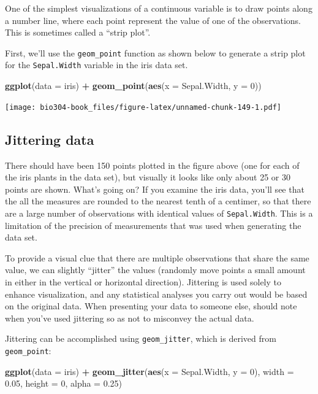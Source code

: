 \documentclass[]{book}
\newenvironment{Shaded}{\begin{snugshade}}{\end{snugshade}}
\newcommand{\DataTypeTok}[1]{\textcolor[rgb]{0.13,0.29,0.53}{#1}}
\newcommand{\DecValTok}[1]{\textcolor[rgb]{0.00,0.00,0.81}{#1}}
\newcommand{\FloatTok}[1]{\textcolor[rgb]{0.00,0.00,0.81}{#1}}
\newcommand{\KeywordTok}[1]{\textcolor[rgb]{0.13,0.29,0.53}{\textbf{#1}}}
\newcommand{\NormalTok}[1]{#1}
\newcommand{\OperatorTok}[1]{\textcolor[rgb]{0.81,0.36,0.00}{\textbf{#1}}}
\newcommand{\StringTok}[1]{\textcolor[rgb]{0.31,0.60,0.02}{#1}}
\theoremstyle{definition}
\theoremstyle{definition}
\theoremstyle{definition}
\theoremstyle{remark}
\begin{document}
One of the simplest visualizations of a continuous variable is to draw
points along a number line, where each point represent the value of one
of the observations. This is sometimes called a ``strip plot''.

First, we'll use the \texttt{geom\_point} function as shown below to
generate a strip plot for the \texttt{Sepal.Width} variable in the iris
data set.

\begin{Shaded}
\begin{Highlighting}[]
\KeywordTok{ggplot}\NormalTok{(}\DataTypeTok{data =}\NormalTok{ iris) }\OperatorTok{+}\StringTok{ }
\StringTok{  }\KeywordTok{geom_point}\NormalTok{(}\KeywordTok{aes}\NormalTok{(}\DataTypeTok{x =}\NormalTok{ Sepal.Width, }\DataTypeTok{y =} \DecValTok{0}\NormalTok{))}
\end{Highlighting}
\end{Shaded}

\texttt{[image: bio304-book\_files/figure-latex/unnamed-chunk-149-1.pdf]}

\hypertarget{jittering-data}{%
\subsection{Jittering data}\label{jittering-data}}

There should have been 150 points plotted in the figure above (one for
each of the iris plants in the data set), but visually it looks like
only about 25 or 30 points are shown. What's going on? If you examine
the iris data, you'll see that the all the measures are rounded to the
nearest tenth of a centimer, so that there are a large number of
observations with identical values of \texttt{Sepal.Width}. This is a
limitation of the precision of measurements that was used when
generating the data set.

To provide a visual clue that there are multiple observations that share
the same value, we can slightly ``jitter'' the values (randomly move
points a small amount in either in the vertical or horizontal
direction). Jittering is used solely to enhance visualization, and any
statistical analyses you carry out would be based on the original data.
When presenting your data to someone else, should note when you've used
jittering so as not to misconvey the actual data.

Jittering can be accomplished using \texttt{geom\_jitter}, which is
derived from \texttt{geom\_point}:

\begin{Shaded}
\begin{Highlighting}[]
\KeywordTok{ggplot}\NormalTok{(}\DataTypeTok{data =}\NormalTok{ iris) }\OperatorTok{+}\StringTok{ }
\StringTok{  }\KeywordTok{geom_jitter}\NormalTok{(}\KeywordTok{aes}\NormalTok{(}\DataTypeTok{x =}\NormalTok{ Sepal.Width, }\DataTypeTok{y =} \DecValTok{0}\NormalTok{), }
              \DataTypeTok{width =} \FloatTok{0.05}\NormalTok{, }\DataTypeTok{height =} \DecValTok{0}\NormalTok{, }\DataTypeTok{alpha =} \FloatTok{0.25}\NormalTok{)}
\end{Highlighting}
\end{Shaded}
\end{document}
